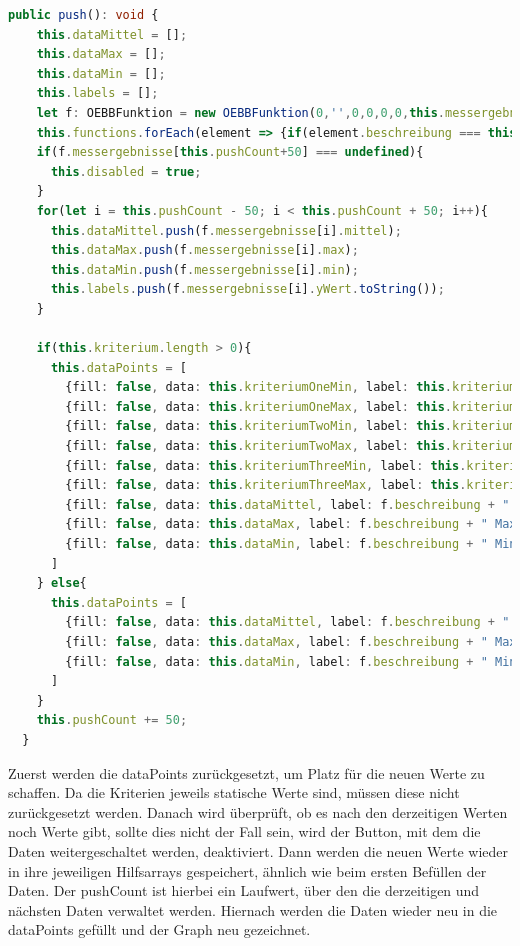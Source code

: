 \begin{lstlisting}[language=Typescript, caption={Push-Methode}]
  public push(): void {
    this.dataMittel = [];
    this.dataMax = [];
    this.dataMin = [];
    this.labels = [];
    let f: OEBBFunktion = new OEBBFunktion(0,'',0,0,0,0,this.messergebnisse);
    this.functions.forEach(element => {if(element.beschreibung === this.selectedFunction){f = element;}});
    if(f.messergebnisse[this.pushCount+50] === undefined){
      this.disabled = true;
    }
    for(let i = this.pushCount - 50; i < this.pushCount + 50; i++){
      this.dataMittel.push(f.messergebnisse[i].mittel);
      this.dataMax.push(f.messergebnisse[i].max);
      this.dataMin.push(f.messergebnisse[i].min);
      this.labels.push(f.messergebnisse[i].yWert.toString());
    }

    if(this.kriterium.length > 0){
      this.dataPoints = [
        {fill: false, data: this.kriteriumOneMin, label: this.kriterium[0].name + " Min"},
        {fill: false, data: this.kriteriumOneMax, label: this.kriterium[0].name + " Max"},
        {fill: false, data: this.kriteriumTwoMin, label: this.kriterium[1].name + " Min"},
        {fill: false, data: this.kriteriumTwoMax, label: this.kriterium[1].name + " Max"},
        {fill: false, data: this.kriteriumThreeMin, label: this.kriterium[2].name + " Min"},
        {fill: false, data: this.kriteriumThreeMax, label: this.kriterium[2].name + " Max"},
        {fill: false, data: this.dataMittel, label: f.beschreibung + " Mittel"},
        {fill: false, data: this.dataMax, label: f.beschreibung + " Max"},
        {fill: false, data: this.dataMin, label: f.beschreibung + " Min"}
      ]
    } else{
      this.dataPoints = [
        {fill: false, data: this.dataMittel, label: f.beschreibung + " Mittel"},
        {fill: false, data: this.dataMax, label: f.beschreibung + " Max"},
        {fill: false, data: this.dataMin, label: f.beschreibung + " Min"}
      ]
    }
    this.pushCount += 50;
  }
\end{lstlisting}

Zuerst werden die dataPoints zurückgesetzt, um Platz für die neuen Werte zu schaffen. Da die Kriterien jeweils statische Werte sind,
müssen diese nicht zurückgesetzt werden. Danach wird überprüft, ob es nach den derzeitigen Werten noch Werte gibt, sollte dies nicht
der Fall sein, wird der Button, mit dem die Daten weitergeschaltet werden, deaktiviert. Dann werden die neuen Werte wieder in ihre 
jeweiligen Hilfsarrays gespeichert, ähnlich wie beim ersten Befüllen der Daten. Der pushCount ist hierbei ein Laufwert, über den die 
derzeitigen und nächsten Daten verwaltet werden. Hiernach werden die Daten wieder neu in die dataPoints gefüllt und der Graph neu 
gezeichnet. 

